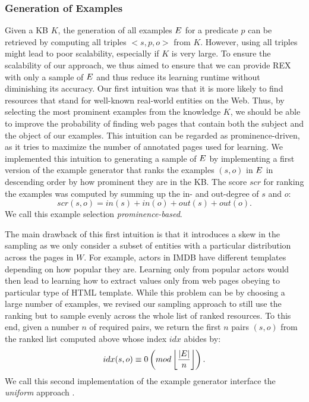 \subsubsection{Generation of Examples}
Given a  \ac{KB} $K$, the generation of all examples $\mbox{\ensuremath{E}}$ for a predicate $p$ can be retrieved by computing all triples $<s,p,o>$ from $K$.
However, using all triples might lead to poor scalability, especially if $K$ is very large.
To ensure the scalability of our approach, we thus aimed to ensure that we can provide REX with only a sample of $\mbox{\ensuremath{E}}$ and thus reduce its learning runtime without diminishing its accuracy.  
Our first intuition was that it is more likely to find resources that stand for well-known real-world entities on the Web. 
Thus, by selecting the most prominent examples from the knowledge $K$, we should be able to improve the probability of finding web pages that contain both the subject and the object of our examples. 
This intuition can be regarded as prominence-driven, as it tries to maximize the number of annotated pages used for learning. 
We implemented this intuition to generating a sample of $\mbox{\ensuremath{E}}$ by implementing a first version of the example generator that ranks the examples $(s, o)$ in $\mbox{\ensuremath{E}}$ in descending order by how prominent they are in the  \ac{KB}. The score $scr$ for ranking the examples was computed by summing up the in- and out-degree of $s$ and $o$:
\begin{equation}
scr(s, o) = in(s) + in(o) + out(s) + out(o).
\end{equation}
We call this example selection \emph{prominence-based}.

The main drawback of this first intuition is that it introduces a skew in the sampling as we only consider a subset of entities with a particular distribution across the pages in $W$. 
For example, actors in IMDB have different templates depending on how popular they are. 
Learning only from popular actors would then lead to learning how to extract values only from web pages obeying to particular type of HTML template. 
While this problem can be by choosing a large number of examples, we revised our sampling approach to still use the ranking but to sample evenly across the whole list of ranked resources. 
To this end, given a number $n$ of required pairs, we return the first $n$ pairs $(s,o)$ from the ranked list computed above whose index $idx$ abides by:
\begin{equation}
idx(s, o) \equiv 0  \left(mod\left \lfloor{\frac{|\mbox{\ensuremath{E}}|}{n}}\right \rfloor \right).
\end{equation}
We call this second implementation of the example generator interface the \emph{uniform} approach .

